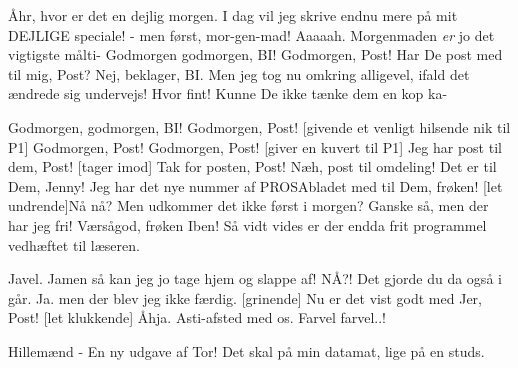 \documentclass[a4paper,11pt]{article}
\begin{document}
\begin{sketch}



 Åhr, hvor er det en dejlig morgen. I dag vil jeg skrive endnu mere på mit DEJLIGE speciale! 
          - men først, mor-gen-mad!
 Aaaaah. Morgenmaden \textit{er} jo det vigtigste målti-
 Godmorgen godmorgen, BI! 
 Godmorgen, Post! 
      Har De post med til mig, Post? 
 Nej, beklager, BI. 
       Men jeg tog nu omkring alligevel, ifald det ændrede sig undervejs! 
 Hvor fint! Kunne De ikke tænke dem en kop ka- 

Godmorgen, godmorgen, BI! 
Godmorgen, Post! 
[givende et venligt hilsende nik til P1] Godmorgen, Post! 
Godmorgen, Post!
[giver en kuvert til P1] Jeg har post til dem, Post!
[tager imod] Tak for posten, Post!    Næh, post til omdeling!
 Det er til Dem, Jenny!  Jeg har det nye nummer af PROSAbladet med til Dem, frøken! 
[let undrende]Nå nå? Men udkommer det ikke først i morgen? 
Ganske så, men der har jeg fri!
 Værsågod, frøken Iben! Så vidt vides er der endda frit programmel vedhæftet til læseren.

 Javel. Jamen så kan jeg jo tage hjem og slappe af!
 NÅ?! Det gjorde du da også i går.
 Ja. men der blev jeg ikke færdig.
[grinende] Nu er det vist godt med Jer, Post!
[let klukkende] Åhja. Asti-afsted med os.
Farvel farvel..!

 Hillemænd - En ny udgave af Tor! Det skal på min datamat, lige på en studs.


\end{sketch}
\end{document}
